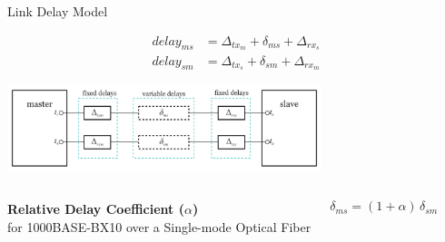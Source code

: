 \documentclass[compress,red]{beamer}
\begin{document}
\begin{frame}{Link Delay Model}

  \begin{align}
    \nonumber delay_{ms} &= \Delta_{tx_m} + \delta_{ms} + \Delta_{rx_s} \\
    \nonumber delay_{sm} &= \Delta_{tx_s} + \delta_{sm} + \Delta_{rx_m}
  \end{align}

   \vspace{0.2cm}

  \begin{center}
  \includegraphics[height=2.5cm]{protocol/delaymodel.pdf}
  \end{center}

\begin{columns}[c]
  \column{2.8in}

    \begin{center}
      \textbf{Relative Delay Coefficient ($\alpha$)} \\
      for 1000BASE-BX10 over a Single-mode Optical Fiber
    \end{center}

  \column{1.5in}
    \begin{center}
      \begin{equation}
      \nonumber \delta_{ms} = (1 + \alpha) \, \delta_{sm}
      \end{equation}
    \end{center}
    \vspace{0.5cm}
\end{columns}
  
\end{frame}
\end{document}

